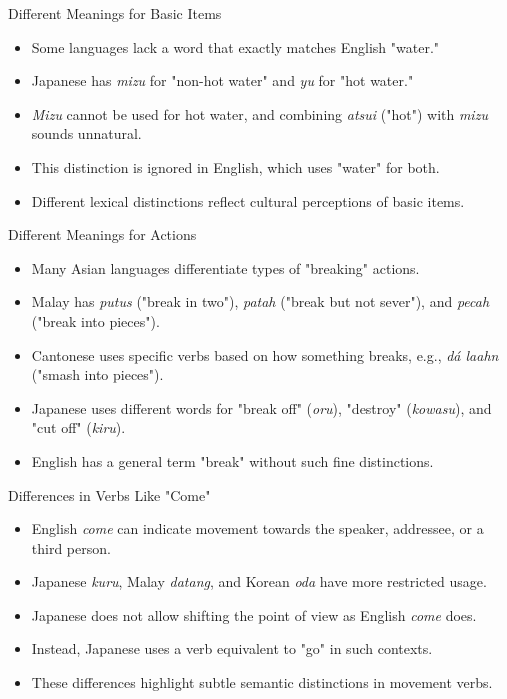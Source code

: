 \documentclass{beamer}
\begin{document}
\begin{frame}{Different Meanings for Basic Items}
    \begin{itemize}
        \item Some languages lack a word that exactly matches English "water."
        \item Japanese has \textit{mizu} for "non-hot water" and \textit{yu} for "hot water."
        \item \textit{Mizu} cannot be used for hot water, and combining \textit{atsui} ("hot") with \textit{mizu} sounds unnatural.
        \item This distinction is ignored in English, which uses "water" for both.
        \item Different lexical distinctions reflect cultural perceptions of basic items.
    \end{itemize}
\end{frame}

\begin{frame}{Different Meanings for Actions}
    \begin{itemize}
        \item Many Asian languages differentiate types of "breaking" actions.
        \item Malay has \textit{putus} ("break in two"), \textit{patah} ("break but not sever"), and \textit{pecah} ("break into pieces").
        \item Cantonese uses specific verbs based on how something breaks, e.g., \textit{dá laahn} ("smash into pieces").
        \item Japanese uses different words for "break off" (\textit{oru}), "destroy" (\textit{kowasu}), and "cut off" (\textit{kiru}).
        \item English has a general term "break" without such fine distinctions.
    \end{itemize}
\end{frame}

\begin{frame}{Differences in Verbs Like "Come"}
    \begin{itemize}
        \item English \textit{come} can indicate movement towards the speaker, addressee, or a third person.
        \item Japanese \textit{kuru}, Malay \textit{datang}, and Korean \textit{oda} have more restricted usage.
        \item Japanese does not allow shifting the point of view as English \textit{come} does.
        \item Instead, Japanese uses a verb equivalent to "go" in such contexts.
        \item These differences highlight subtle semantic distinctions in movement verbs.
    \end{itemize}
\end{frame}
\end{document}
